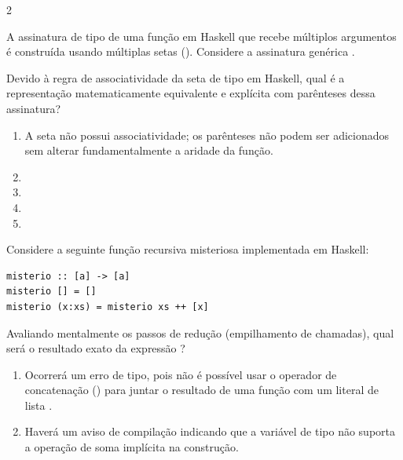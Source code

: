 \documentclass[a4paper,10pt,brazil]{article}
\begin{document}
\begin{multicols}{2}
\begin{enumerate}
\end{enumerate}

A assinatura de tipo de uma função em Haskell que recebe múltiplos argumentos é construída usando múltiplas setas (\haskellinline{->}). Considere a assinatura genérica . 

Devido à regra de associatividade da seta de tipo em Haskell, qual é a representação matematicamente equivalente e explícita com parênteses dessa assinatura?

\begin{enumerate}
  \item A seta não possui associatividade; os parênteses não podem ser adicionados sem alterar fundamentalmente a aridade da função.

  \item {}

  \item {}

  \item {}

  \item {}


\end{enumerate}

Considere a seguinte função recursiva misteriosa implementada em Haskell:

\begin{verbatim}
misterio :: [a] -> [a]
misterio [] = []
misterio (x:xs) = misterio xs ++ [x]
\end{verbatim}

Avaliando mentalmente os passos de redução (empilhamento de chamadas), qual será o resultado exato da expressão ?

\begin{enumerate}
  \item Ocorrerá um erro de tipo, pois não é possível usar o operador de concatenação (\haskellinline{++}) para juntar o resultado de uma função com um literal de lista \haskellinline{[x]}.

  \item Haverá um aviso de compilação indicando que a variável de tipo  não suporta a operação de soma implícita na construção.


\end{enumerate}
\end{multicols}
\end{document}
